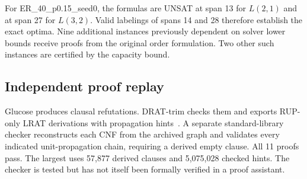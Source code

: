For ER\_40\_p0.15\_seed0, the formulas are UNSAT at span 13 for
$L(2,1)$ and at span 27 for $L(3,2)$. Valid labelings of spans 14 and 28
therefore establish the exact optima. Nine additional instances previously
dependent on solver lower bounds receive proofs from the original order
formulation. Two other such instances are certified by the capacity bound.

\subsection{Independent proof replay}
Glucose produces clausal refutations. DRAT-trim checks them and exports
RUP-only LRAT derivations with propagation hints~\cite{cruzfilipe2017lrat}.
A separate standard-library checker reconstructs each CNF from the archived
graph and validates every indicated unit-propagation chain, requiring a
derived empty clause. All 11 proofs pass. The largest uses 57,877 derived
clauses and 5,075,028 checked hints. The checker is tested but has not itself
been formally verified in a proof assistant.

\begin{table}[H]
\centering\small
\caption{Exact optima for the six graphs with formerly open intervals.}

\end{table}
